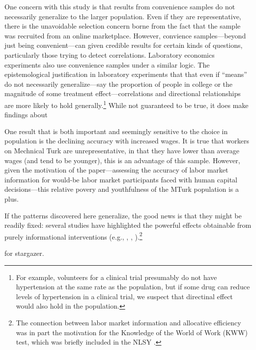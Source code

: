 \documentclass[11pt]{article}
\begin{document}
One concern with this study is that results from convenience samples do not necessarily generalize to the larger population. 
Even if they are representative, there is the unavoidable selection concern borne from the fact that the sample was recruited from an online marketplace. 
However, convience samples---beyond just being convenient---can given credible results for certain kinds of questions, particularly those trying to detect correlations.
Laboratory economics experiments also use convenience samples under a similar logic. 
The epistemological justification in laboratory experiments that that even if ``means'' do not necessarily generalize---say the proportion of people in college or the magnitude of some treatment effect---correlations and directional relationships are more likely to hold generally.\footnote{ 
For example, volunteers for a clinical trial presumably do not have hypertension at the same rate as the population, but if some drug can reduce levels of hypertension in a clinical trial, we suspect that directinal effect would also hold in the population.}
While not guaranteed to be true, it does make findings about 

One result that is both important and seemingly sensitive to the choice in population is the declining accuracy with increased wages. 
It is true that workers on Mechnical Turk are unrepresentative, in that they have lower than average wages (and tend to be younger), this is an advantage of this sample. 
However, given the motivation of the paper---assessing the accuracy of labor market information for would-be labor market participants faced with human capital decisions---this relative povery and youthfulness of the MTurk population is a plus. 

If the patterns discovered here generalize, the good news is that they might be readily fixed: 
several studies have highlighted the powerful effects obtainable from purely informational interventions (e.g., \cite{jensen2010perceived}, \cite{dupas2009teenagers}, \cite{card2010inequality}).\footnote{The connection between labor market information and allocative efficiency was in part the motivation for the Knowledge of the World of Work (KWW) test, which was briefly included in the NLSY \citep{kohen1975}.}


\cite{rees1966information} 
\cite{stigler1962information}
\cite{hlavac2013} for stargazer. 
\cite{ward1992} 
\cite{pallais2013referential} 
\cite{burks2013value} 
\cite{betts1996students} 
\cite{webbink2004} 
\cite{dominitz1996} 
\end{document}
